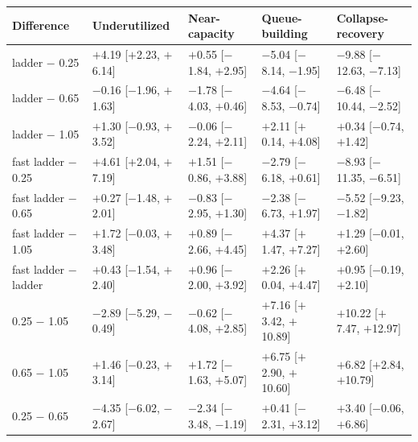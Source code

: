 \begin{tabular}{lllll}
\toprule
Difference & Underutilized & Near-capacity & Queue-building & Collapse-recovery \\
\midrule
ladder $-$ 0.25 & $+$4.19 [$+$2.23, $+$6.14] & $+$0.55 [$-$1.84, $+$2.95] & $-$5.04 [$-$8.14, $-$1.95] & $-$9.88 [$-$12.63, $-$7.13] \\
ladder $-$ 0.65 & $-$0.16 [$-$1.96, $+$1.63] & $-$1.78 [$-$4.03, $+$0.46] & $-$4.64 [$-$8.53, $-$0.74] & $-$6.48 [$-$10.44, $-$2.52] \\
ladder $-$ 1.05 & $+$1.30 [$-$0.93, $+$3.52] & $-$0.06 [$-$2.24, $+$2.11] & $+$2.11 [$+$0.14, $+$4.08] & $+$0.34 [$-$0.74, $+$1.42] \\
\midrule
fast ladder $-$ 0.25 & $+$4.61 [$+$2.04, $+$7.19] & $+$1.51 [$-$0.86, $+$3.88] & $-$2.79 [$-$6.18, $+$0.61] & $-$8.93 [$-$11.35, $-$6.51] \\
fast ladder $-$ 0.65 & $+$0.27 [$-$1.48, $+$2.01] & $-$0.83 [$-$2.95, $+$1.30] & $-$2.38 [$-$6.73, $+$1.97] & $-$5.52 [$-$9.23, $-$1.82] \\
fast ladder $-$ 1.05 & $+$1.72 [$-$0.03, $+$3.48] & $+$0.89 [$-$2.66, $+$4.45] & $+$4.37 [$+$1.47, $+$7.27] & $+$1.29 [$-$0.01, $+$2.60] \\
\midrule
fast ladder $-$ ladder & $+$0.43 [$-$1.54, $+$2.40] & $+$0.96 [$-$2.00, $+$3.92] & $+$2.26 [$+$0.04, $+$4.47] & $+$0.95 [$-$0.19, $+$2.10] \\
\midrule
0.25 $-$ 1.05 & $-$2.89 [$-$5.29, $-$0.49] & $-$0.62 [$-$4.08, $+$2.85] & $+$7.16 [$+$3.42, $+$10.89] & $+$10.22 [$+$7.47, $+$12.97] \\
0.65 $-$ 1.05 & $+$1.46 [$-$0.23, $+$3.14] & $+$1.72 [$-$1.63, $+$5.07] & $+$6.75 [$+$2.90, $+$10.60] & $+$6.82 [$+$2.84, $+$10.79] \\
0.25 $-$ 0.65 & $-$4.35 [$-$6.02, $-$2.67] & $-$2.34 [$-$3.48, $-$1.19] & $+$0.41 [$-$2.31, $+$3.12] & $+$3.40 [$-$0.06, $+$6.86] \\
\bottomrule
\end{tabular}
